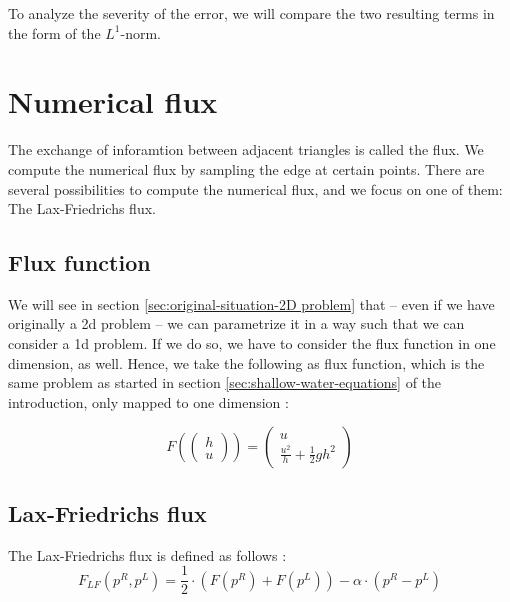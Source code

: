 \documentclass{article}
\begin{document}
To analyze the severity of the error, we will compare the two resulting terms in the form of the $L^1$-norm.

\section{Numerical flux}
\label{sec:numerical-flux}

The exchange of inforamtion between adjacent triangles is called the flux. We compute the numerical flux by sampling the edge at certain points. There are several possibilities to compute the numerical flux, and we focus on one of them: The Lax-Friedrichs flux.

\subsection{Flux function}
\label{sec:flux-function-intro}

We will see in section \ref{sec:original-situation-2D problem} that -- even if we have originally a 2d problem -- we can parametrize it in a way such that we can consider a 1d problem. If we do so, we have to consider the flux function in one dimension, as well. Hence, we take the following as flux function, which is the same problem as started in section \ref{sec:shallow-water-equations} of the introduction, only mapped to one dimension \cite{george2004numerical}:

\begin{equation}
  \label{eq:flux-function-definition}
  F\left(
    \begin{pmatrix}
      h \\ u
    \end{pmatrix}
  \right) =
  \begin{pmatrix}
    u \\
    \frac{u^2}{h} + \frac{1}{2} g h^2
  \end{pmatrix}
\end{equation}

\subsection{Lax-Friedrichs flux}
\label{sec:lax-friedrich-definition}

The Lax-Friedrichs flux is defined as follows \cite{leveque2002finite}:
\begin{equation}
  \label{eq:lax-friedrich-definition}
  F_{LF}(p^R,p^L) = \dfrac{1}{2}\cdot (F(p^R) + F(p^L)) - \alpha \cdot (p^R - p^L)
\end{equation}
\end{document}
